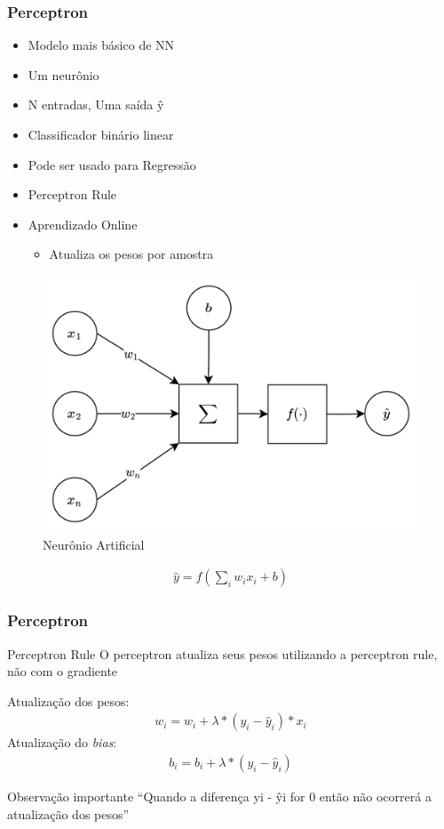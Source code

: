 \documentclass{beamer}
\begin{document}
\begin{frame}
	\frametitle{Perceptron}
	\begin{itemize}
		\item Modelo mais básico de NN
		\item Um neurônio
		\item N entradas, Uma saída ŷ
		\item Classificador binário linear
		\item Pode ser usado para Regressão
		\item Perceptron Rule
		\item Aprendizado Online
		\begin{itemize}
			\item Atualiza os pesos por amostra
		\end{itemize}
	\end{itemize}
	\begin{figure}
		\centering
		\includegraphics[width=0.4\linewidth]{figures/neuron_ai.png}
		\caption{Neurônio Artificial}
	\end{figure}
	
	\begin{gather*}
		\hat{y} = f( \sum_i w_i x_i + b)
	\end{gather*}
\end{frame}
\begin{frame}
	\frametitle{Perceptron}
		\begin{block}{Perceptron Rule}
			O perceptron atualiza seus pesos utilizando a perceptron rule, não com o gradiente
	\end{block}
Atualização dos pesos:
	\begin{gather*}
		w_i = w_i + \lambda*(y_i -  \hat{y}_i)* x_i
	\end{gather*}
	Atualização do \textit{bias}:
	\begin{gather*}
		b_i = b_i + \lambda*(y_i -  \hat{y}_i)
	\end{gather*}
\begin{alertblock}{Observação importante}
``Quando a diferença yi -  ŷi for 0 então não ocorrerá a atualização dos pesos''
\end{alertblock}

\end{frame}
\end{document}
